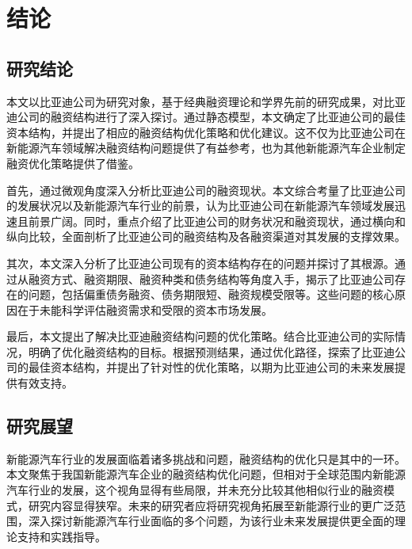 \chapter{结论}
\section{研究结论}
本文以比亚迪公司为研究对象，基于经典融资理论和学界先前的研究成果，对比亚迪公司的融资结构进行了深入探讨。通过静态模型，本文确定了比亚迪公司的最佳资本结构，并提出了相应的融资结构优化策略和优化建议。这不仅为比亚迪公司在新能源汽车领域解决融资结构问题提供了有益参考，也为其他新能源汽车企业制定融资优化策略提供了借鉴。

首先，通过微观角度深入分析比亚迪公司的融资现状。本文综合考量了比亚迪公司的发展状况以及新能源汽车行业的前景，认为比亚迪公司在新能源汽车领域发展迅速且前景广阔。同时，重点介绍了比亚迪公司的财务状况和融资现状，通过横向和纵向比较，全面剖析了比亚迪公司的融资结构及各融资渠道对其发展的支撑效果。

其次，本文深入分析了比亚迪公司现有的资本结构存在的问题并探讨了其根源。通过从融资方式、融资期限、融资种类和债务结构等角度入手，揭示了比亚迪公司存在的问题，包括偏重债务融资、债务期限短、融资规模受限等。这些问题的核心原因在于未能科学评估融资需求和受限的资本市场发展。

最后，本文提出了解决比亚迪融资结构问题的优化策略。结合比亚迪公司的实际情况，明确了优化融资结构的目标。根据预测结果，通过优化路径，探索了比亚迪公司的最佳资本结构，并提出了针对性的优化策略，以期为比亚迪公司的未来发展提供有效支持。

\section{研究展望}
新能源汽车行业的发展面临着诸多挑战和问题，融资结构的优化只是其中的一环。本文聚焦于我国新能源汽车企业的融资结构优化问题，但相对于全球范围内新能源汽车行业的发展，这个视角显得有些局限，并未充分比较其他相似行业的融资模式，研究内容显得狭窄。未来的研究者应将研究视角拓展至新能源行业的更广泛范围，深入探讨新能源汽车行业面临的多个问题，为该行业未来发展提供更全面的理论支持和实践指导。
